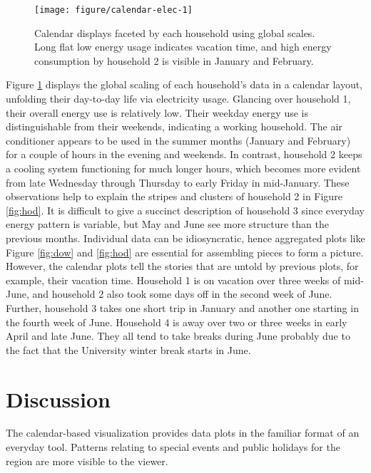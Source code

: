 \documentclass[12pt]{article}
\begin{document}
\begin{figure}

{\centering \texttt{[image: figure/calendar-elec-1]} 

}

\caption{Calendar displays faceted by each household using global scales. Long flat low energy usage indicates vacation time, and high energy consumption by household 2 is visible in January and February.}\label{fig:calendar-elec}
\end{figure}



Figure \ref{fig:calendar-elec} displays the global scaling of each household's data in a calendar layout, unfolding their day-to-day life via electricity usage. Glancing over household 1, their overall energy use is relatively low. Their weekday energy use is distinguishable from their weekends, indicating a working household. The air conditioner appears to be used in the summer months (January and February) for a couple of hours in the evening and weekends. In contrast, household 2 keeps a cooling system functioning for much longer hours, which becomes more evident from late Wednesday through Thursday to early Friday in mid-January. These observations help to explain the stripes and clusters of household 2 in Figure \ref{fig:hod}. It is difficult to give a succinct description of household 3 since everyday energy pattern is variable, but May and June see more structure than the previous months. Individual data can be idiosyncratic, hence aggregated plots like Figure \ref{fig:dow} and \ref{fig:hod} are essential for assembling pieces to form a picture. However, the calendar plots tell the stories that are untold by previous plots, for example, their vacation time. Household 1 is on vacation over three weeks of mid-June, and household 2 also took some days off in the second week of June. Further, household 3 takes one short trip in January and another one starting in the fourth week of June. Household 4 is away over two or three weeks in early April and late June. They all tend to take breaks during June probably due to the fact that the University winter break starts in June.

\hypertarget{sec:discussion}{%
\section{Discussion}\label{sec:discussion}}

The calendar-based visualization provides data plots in the familiar format of an everyday tool. Patterns relating to special events and public holidays for the region are more visible to the viewer.
\end{document}
